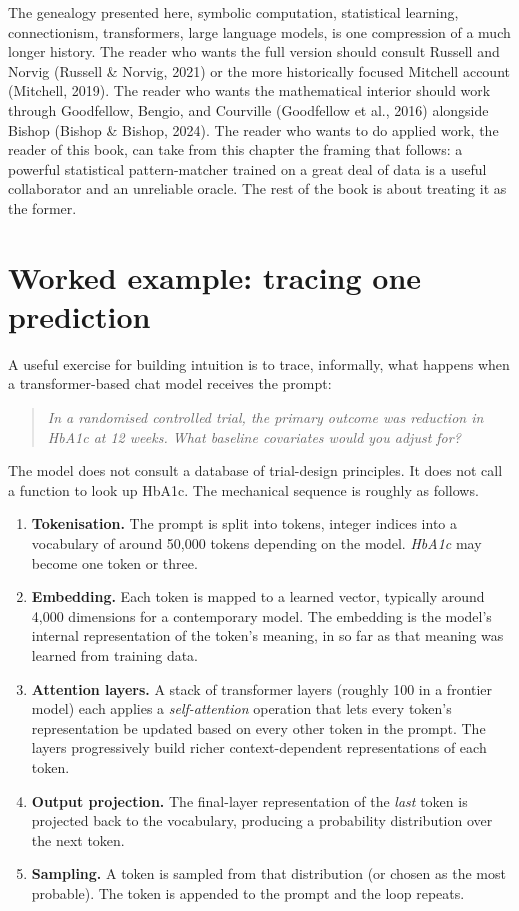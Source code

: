 \documentclass[
  letterpaper,
  11pt]{scrbook}
\providecommand{\tightlist}{%
  \setlength{\itemsep}{0pt}\setlength{\parskip}{0pt}}
\begin{document}
The genealogy presented here, symbolic computation, statistical
learning, connectionism, transformers, large language models, is one
compression of a much longer history. The reader who wants the full
version should consult Russell and Norvig (Russell \& Norvig, 2021) or
the more historically focused Mitchell account (Mitchell, 2019). The
reader who wants the mathematical interior should work through
Goodfellow, Bengio, and Courville (Goodfellow et al., 2016) alongside
Bishop (Bishop \& Bishop, 2024). The reader who wants to do applied
work, the reader of this book, can take from this chapter the framing
that follows: a powerful statistical pattern-matcher trained on a great
deal of data is a useful collaborator and an unreliable oracle. The rest
of the book is about treating it as the former.

\section{Worked example: tracing one
prediction}\label{worked-example-tracing-one-prediction}

A useful exercise for building intuition is to trace, informally, what
happens when a transformer-based chat model receives the prompt:

\begin{quote}
\emph{In a randomised controlled trial, the primary outcome was
reduction in HbA1c at 12 weeks. What baseline covariates would you
adjust for?}
\end{quote}

The model does not consult a database of trial-design principles. It
does not call a function to look up HbA1c. The mechanical sequence is
roughly as follows.

\begin{enumerate}
\def\labelenumi{\arabic{enumi}.}
\tightlist
\item
  \textbf{Tokenisation.} The prompt is split into tokens, integer
  indices into a vocabulary of around 50,000 tokens depending on the
  model. \emph{HbA1c} may become one token or three.
\item
  \textbf{Embedding.} Each token is mapped to a learned vector,
  typically around 4,000 dimensions for a contemporary model. The
  embedding is the model's internal representation of the token's
  meaning, in so far as that meaning was learned from training data.
\item
  \textbf{Attention layers.} A stack of transformer layers (roughly 100
  in a frontier model) each applies a \emph{self-attention} operation
  that lets every token's representation be updated based on every other
  token in the prompt. The layers progressively build richer
  context-dependent representations of each token.
\item
  \textbf{Output projection.} The final-layer representation of the
  \emph{last} token is projected back to the vocabulary, producing a
  probability distribution over the next token.
\item
  \textbf{Sampling.} A token is sampled from that distribution (or
  chosen as the most probable). The token is appended to the prompt and
  the loop repeats.
\end{enumerate}
\end{document}
